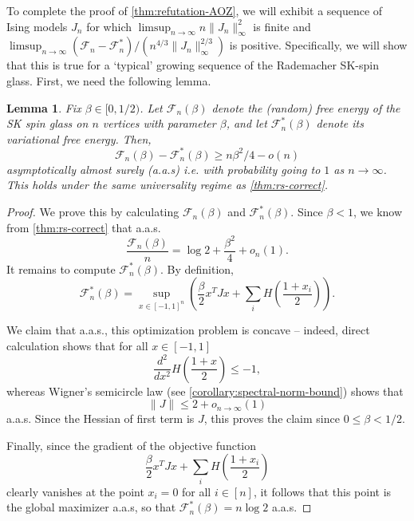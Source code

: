 \documentclass[11pt, oneside, english]{article}
\newcommand{\F}{\mathcal{F}}
\newtheorem{theorem}{Theorem}[section]
\newtheorem{lemma}[theorem]{Lemma}
\theoremstyle{definition}
\theoremstyle{plain}
\begin{document}
To complete the proof of \cref{thm:refutation-AOZ}, we will exhibit a sequence of Ising models $J_n$ for which $\limsup_{n \to \infty}n\|J_n\|_{\infty}^{2}$ is finite and $\limsup_{n \to \infty}\left(\F_n - \F_n^{*}\right)/\left(n^{4/3}\|J_n\|_{\infty}^{2/3}\right)$ is positive. Specifically, we will show that this is true for a `typical' growing sequence of the Rademacher SK-spin glass. First, we need the following lemma.
\begin{lemma}
\label{lemma:error-for-spin-glass}
Fix $\beta \in [0,1/2)$. Let $\F_n(\beta)$ denote the (random) free energy of the SK spin glass on $n$ vertices with parameter $\beta$, and let $\F_n^*(\beta)$ denote its variational free energy. Then,
\[ \F_n(\beta) - \F^*_n(\beta) \ge n\beta^2/4 - o(n) \]
asymptotically almost surely (a.a.s) i.e. with probability going to $1$ as $n \to \infty$. This holds under the same universality regime as \cref{thm:rs-correct}.
\end{lemma}
\begin{proof}

We prove this by calculating $\F_n(\beta)$ and $\F_n^*(\beta)$.
Since $\beta < 1$, we know from \cref{thm:rs-correct} that a.a.s.
\[ \frac{\F_n(\beta)}{n} = \log 2 + \frac{\beta^2}{4} + o_{n}(1). \] 
It remains to compute $\F_n^*(\beta)$. By definition,
\[ \F_n^*(\beta) = \sup_{x \in [-1,1]^n}\left( \frac{\beta}{2} x^T J x + \sum_i H\left(\frac{1 + x_i}{2}\right)\right). \]

We claim that a.a.s., this optimization problem is concave -- indeed, direct calculation shows that for all $x\in [-1,1]$ $$\frac{d^2}{dx^2} H\left(\frac{1 + x}{2}\right) \le -1,$$
whereas Wigner's semicircle law (see \cref{corollary:spectral-norm-bound}) shows that $$\|J\| \le 2 + o_{n \to \infty}(1)$$ a.a.s. Since the Hessian of first term is $J$, this proves the claim since $0\leq \beta < 1/2$. 

Finally, since the gradient of the objective function 
$$\frac{\beta}{2} x^T J x + \sum_i H\left(\frac{1 + x_i}{2}\right)$$
clearly vanishes at the point $x_i = 0$ for all $i\in [n]$, it follows that this point is the global maximizer a.a.s, so that $\F_n^*(\beta) = n\log{2}$ a.a.s. 
\end{proof}
\end{document}
